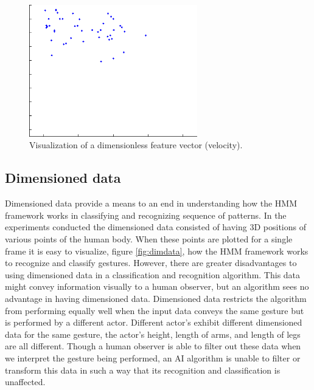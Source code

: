 \documentclass[]{report}   %
\begin{document}
\begin{figure}[htbp]
	\centering
		\includegraphics[width=0.65\textwidth]{dimlessdata.png}
	\caption{Visualization of a dimensionless feature vector (velocity).}
	\label{fig:dimlessdata}
\end{figure}

\subsection*{Dimensioned data}
Dimensioned data provide a means to an end in understanding how the HMM framework works in classifying and recognizing sequence of patterns. In the experiments conducted the dimensioned data consisted of having 3D positions of various points of the human body. When these points are plotted for a single frame it is easy to visualize, figure \ref{fig:dimdata}, how the HMM framework works to recognize and classify gestures. However, there are greater disadvantages to using dimensioned data in a classification and recognition algorithm. This data might convey information visually to a human observer, but an algorithm sees no advantage in having dimensioned data. Dimensioned data restricts the algorithm from performing equally well when the input data conveys the same gesture but is performed by a different actor. Different actor's exhibit different dimensioned data for the same gesture, the actor's height, length of arms, and length of legs are all different. Though a human observer is able to filter out these data when we interpret the gesture being performed, an AI algorithm is unable to filter or transform this data in such a way that its recognition and classification is unaffected. 
\end{document}
